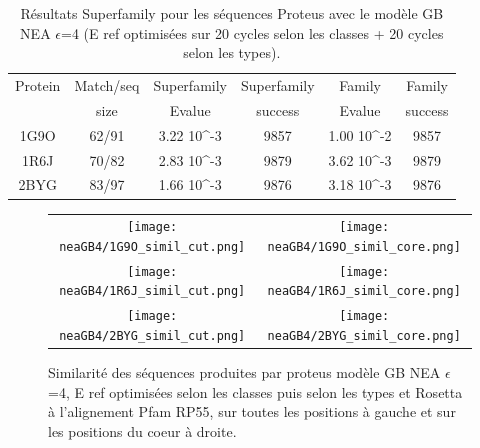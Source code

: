    \clearpage
\begin{table}[h]
  \raggedleft{}
  
  \begin{tabular}{cccccc}
    
    \toprule
    Protein & Match/seq & Superfamily & Superfamily & Family & Family \\
            & size      & Evalue      & success     & Evalue & success\\
    \cmidrule{1-6}
    1G9O  & 62/91 & 3.22 10^{-3}  & 9857  & 1.00 10^{-2} & 9857 \\
    1R6J  & 70/82 & 2.83 10^{-3}  & 9879  & 3.62 10^{-3} & 9879 \\
    2BYG  & 83/97 & 1.66 10^{-3}  & 9876  & 3.18 10^{-3} & 9876 \\

    \bottomrule        
  \end{tabular}   
  \caption{Résultats Superfamily pour les séquences Proteus avec le modèle GB NEA $\epsilon$=4 (E ref optimisées sur 20 cycles selon les classes + 20 cycles selon les types).}   
  \label{tab:superfamily_model_B6}       
\end{table}

    \clearpage
    \thispagestyle{empty}
   \begin{figure}[t]
     \centering
     \begin{tabular}{cc} 
       \texttt{[image: neaGB4/1G9O\_simil\_cut.png]} &
       \texttt{[image: neaGB4/1G9O\_simil\_core.png]} \\
       \texttt{[image: neaGB4/1R6J\_simil\_cut.png]} &
       \texttt{[image: neaGB4/1R6J\_simil\_core.png]} \\
       \texttt{[image: neaGB4/2BYG\_simil\_cut.png]} &
       \texttt{[image: neaGB4/2BYG\_simil\_core.png]} \\
     \end{tabular}
     \caption{Similarité des séquences produites par proteus modèle GB NEA $\epsilon$=4, E ref optimisées selon les classes puis selon les types et Rosetta à l'alignement Pfam RP55, sur toutes les positions à gauche  et sur les positions du coeur à droite.}

\label{graph:Simil_modelExactGB}


   \end{figure}


